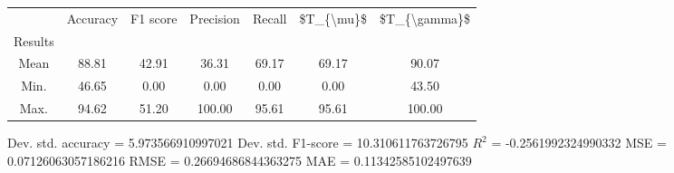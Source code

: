 \begin{tabular}{|c|c|c|c|c|c|c|}
\toprule
{} &  Accuracy &  F1 score &  Precision &  Recall &  \$T\_\{\textbackslash mu\}\$ &  \$T\_\{\textbackslash gamma\}\$ \\
Results &           &           &            &         &            &               \\
\hline
Mean    &     88.81 &     42.91 &      36.31 &   69.17 &      69.17 &         90.07 \\
Min.    &     46.65 &      0.00 &       0.00 &    0.00 &       0.00 &         43.50 \\
Max.    &     94.62 &     51.20 &     100.00 &   95.61 &      95.61 &        100.00 \\
\bottomrule
\end{tabular}

 Dev. std. accuracy = 5.973566910997021
 Dev. std. F1-score = 10.310611763726795
 $R^2$ = -0.2561992324990332
 MSE = 0.07126063057186216
 RMSE = 0.26694686844363275
 MAE = 0.11342585102497639